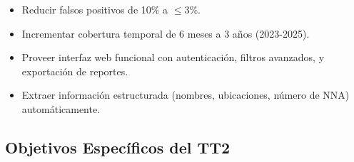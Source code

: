 \begin{itemize}
    \item Reducir falsos positivos de 10\% a $\leq$3\%.
    \item Incrementar cobertura temporal de 6 meses a 3 años (2023-2025).
    \item Proveer interfaz web funcional con autenticación, filtros avanzados, y exportación de reportes.
    \item Extraer información estructurada (nombres, ubicaciones, número de NNA) automáticamente.
\end{itemize}

\subsection{Objetivos Específicos del TT2}
\label{subsec:objetivos_especificos_tt2}

